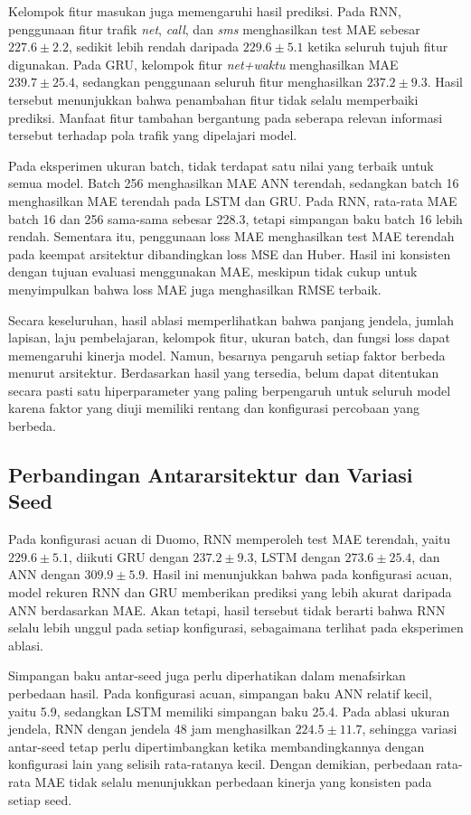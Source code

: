 \documentclass[conference,a4paper]{IEEEtran}
\begin{document}
Kelompok fitur masukan juga memengaruhi hasil prediksi.
Pada RNN, penggunaan fitur trafik \textit{net}, \textit{call},
dan \textit{sms} menghasilkan test MAE sebesar
$227.6 \pm 2.2$, sedikit lebih rendah daripada
$229.6 \pm 5.1$ ketika seluruh tujuh fitur digunakan.
Pada GRU, kelompok fitur \textit{net+waktu} menghasilkan
MAE $239.7 \pm 25.4$, sedangkan penggunaan seluruh fitur
menghasilkan $237.2 \pm 9.3$. Hasil tersebut menunjukkan
bahwa penambahan fitur tidak selalu memperbaiki prediksi.
Manfaat fitur tambahan bergantung pada seberapa relevan
informasi tersebut terhadap pola trafik yang dipelajari model.

Pada eksperimen ukuran batch, tidak terdapat satu nilai
yang terbaik untuk semua model. Batch 256 menghasilkan
MAE ANN terendah, sedangkan batch 16 menghasilkan MAE
terendah pada LSTM dan GRU. Pada RNN, rata-rata MAE batch
16 dan 256 sama-sama sebesar 228.3, tetapi simpangan baku
batch 16 lebih rendah. Sementara itu, penggunaan loss MAE
menghasilkan test MAE terendah pada keempat arsitektur
dibandingkan loss MSE dan Huber. Hasil ini konsisten dengan
tujuan evaluasi menggunakan MAE, meskipun tidak cukup untuk
menyimpulkan bahwa loss MAE juga menghasilkan RMSE terbaik.

Secara keseluruhan, hasil ablasi memperlihatkan bahwa
panjang jendela, jumlah lapisan, laju pembelajaran, kelompok
fitur, ukuran batch, dan fungsi loss dapat memengaruhi
kinerja model. Namun, besarnya pengaruh setiap faktor
berbeda menurut arsitektur. Berdasarkan hasil yang tersedia,
belum dapat ditentukan secara pasti satu hiperparameter
yang paling berpengaruh untuk seluruh model karena faktor
yang diuji memiliki rentang dan konfigurasi percobaan
yang berbeda.

\subsection{Perbandingan Antararsitektur dan Variasi Seed}

Pada konfigurasi acuan di Duomo, RNN memperoleh test MAE
terendah, yaitu $229.6 \pm 5.1$, diikuti GRU dengan
$237.2 \pm 9.3$, LSTM dengan $273.6 \pm 25.4$, dan ANN
dengan $309.9 \pm 5.9$. Hasil ini menunjukkan bahwa pada
konfigurasi acuan, model rekuren RNN dan GRU memberikan
prediksi yang lebih akurat daripada ANN berdasarkan MAE.
Akan tetapi, hasil tersebut tidak berarti bahwa RNN selalu
lebih unggul pada setiap konfigurasi, sebagaimana terlihat
pada eksperimen ablasi.

Simpangan baku antar-seed juga perlu diperhatikan dalam
menafsirkan perbedaan hasil. Pada konfigurasi acuan,
simpangan baku ANN relatif kecil, yaitu 5.9, sedangkan
LSTM memiliki simpangan baku 25.4. Pada ablasi ukuran
jendela, RNN dengan jendela 48 jam menghasilkan
$224.5 \pm 11.7$, sehingga variasi antar-seed tetap perlu
dipertimbangkan ketika membandingkannya dengan konfigurasi
lain yang selisih rata-ratanya kecil. Dengan demikian,
perbedaan rata-rata MAE tidak selalu menunjukkan perbedaan
kinerja yang konsisten pada setiap seed.
\end{document}
